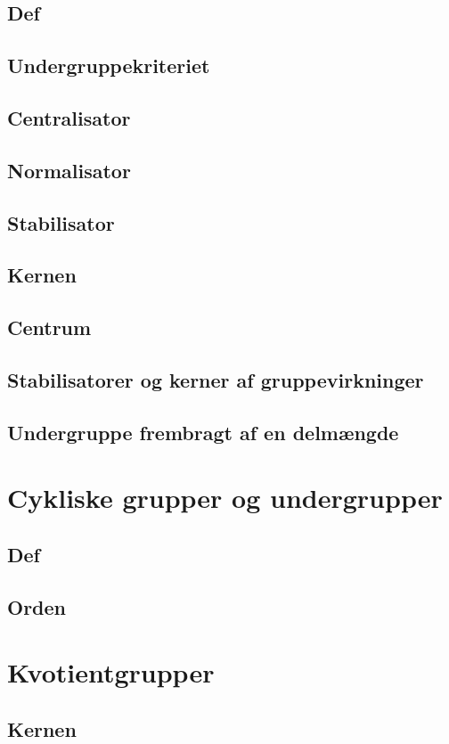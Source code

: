 \documentclass[11pt]{article}
\begin{document}
\subsection*{Def}
\subsection*{Undergruppekriteriet}
\subsection*{Centralisator}
\subsection*{Normalisator}
\subsection*{Stabilisator}
\subsection*{Kernen}
\subsection*{Centrum}
\subsection*{Stabilisatorer og kerner af gruppevirkninger}
\subsection*{Undergruppe frembragt af en delmængde}

\section*{Cykliske grupper og undergrupper}
\subsection*{Def}
\subsection*{Orden}

\section*{Kvotientgrupper}
\subsection*{Kernen}
\end{document}

